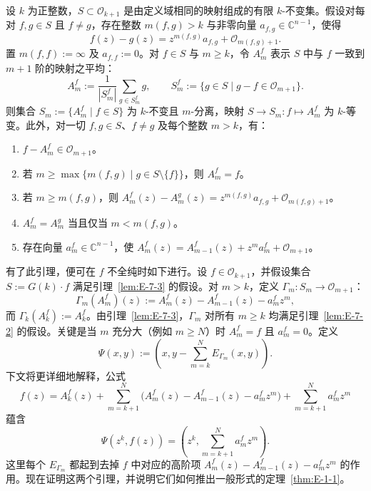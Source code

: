 \begin{lemma}\label{lem:E-7-3}
设 $k$ 为正整数，$S\subset\mathcal O_{k+1}$ 是由定义域相同的映射组成的有限 $k$-不变集。假设对每对 $f,g\in S$ 且 $f\ne g$，存在整数 $m(f,g)>k$ 与非零向量 $a_{f,g}\in\mathbb C^{n-1}$，使得
\[
  f(z)-g(z)=z^{m(f,g)}a_{f,g}+\mathcal O_{m(f,g)+1}.
\]
置 $m(f,f):=\infty$ 及 $a_{f,f}:=0$。对 $f\in S$ 与 $m\ge k$，令 $A_m^f$ 表示 $S$ 中与 $f$ 一致到 $m+1$ 阶的映射之平均：
\[
  A_m^f:=\frac1{|S_m^f|}\sum_{g\in S_m^f}g,
  \qquad S_m^f:=\{g\in S\mid g-f\in\mathcal O_{m+1}\}.
\]
则集合 $S_m:=\{A_m^f\mid f\in S\}$ 为 $k$-不变且 $m$-分离，映射 $S\to S_m:f\mapsto A_m^f$ 为 $k$-等变。此外，对一切 $f,g\in S$、$f\ne g$ 及每个整数 $m>k$，有：
\begin{enumerate}
\item[\textup{(i)}] $f-A_m^f\in\mathcal O_{m+1}$。
\item[\textup{(ii)}] 若 $m\ge\max\{m(f,g)\mid g\in S\setminus\{f\}\}$，则 $A_m^f=f$。
\item[\textup{(iii)}] 若 $m\ge m(f,g)$，则 $A_m^f(z)-A_m^g(z)=z^{m(f,g)}a_{f,g}+\mathcal O_{m(f,g)+1}$。
\item[\textup{(iv)}] $A_m^f=A_m^g$ 当且仅当 $m<m(f,g)$。
\item[\textup{(v)}] 存在向量 $a_m^f\in\mathbb C^{n-1}$，使 $A_m^f(z)=A_{m-1}^f(z)+z^ma_m^f+\mathcal O_{m+1}$。
\end{enumerate}
\end{lemma}

有了此引理，便可在 $f$ 不全纯时如下进行。设 $f\in\mathcal O_{k+1}$，并假设集合 $S:=G(k)\cdot f$ 满足引理~\ref{lem:E-7-3} 的假设。对 $m>k$，定义 $\Gamma_m:S_m\to\mathcal O_{m+1}$：
\[
  \Gamma_m(A_m^f)(z):=A_m^f(z)-A_{m-1}^f(z)-a_m^fz^m,
\]
而 $\Gamma_k(A_k^f):=A_k^f$。由引理~\ref{lem:E-7-3}，$\Gamma_m$ 对所有 $m\ge k$ 均满足引理~\ref{lem:E-7-2} 的假设。关键是当 $m$ 充分大（例如 $m\ge N$）时 $A_m^f=f$ 且 $a_m^f=0$。定义
\[
  \Psi(x,y):=\left(x,y-\sum_{m=k}^{N}E_{\Gamma_m}(x,y)\right).
\]
下文将更详细地解释，公式
\[
  f(z)=A_k^f(z)+\sum_{m=k+1}^{N}
  \bigl(A_m^f(z)-A_{m-1}^f(z)-a_m^fz^m\bigr)
  +\sum_{m=k+1}^{N}a_m^fz^m
\]
蕴含
\[
  \Psi(z^k,f(z))=\left(z^k,\sum_{m=k+1}^{N}a_m^fz^m\right).
\]
这里每个 $E_{\Gamma_m}$ 都起到去掉 $f$ 中对应的高阶项 $A_m^f(z)-A_{m-1}^f(z)-a_m^fz^m$ 的作用。现在证明这两个引理，并说明它们如何推出一般形式的定理~\ref{thm:E-1-1}。

